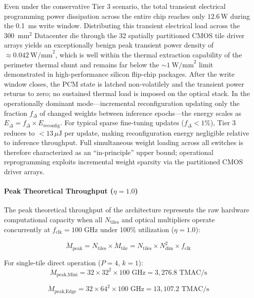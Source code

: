 \documentclass[journal]{IEEEtran}
\begin{document}
Even under the conservative Tier 3 scenario, the total transient electrical programming power dissipation across the entire chip reaches only $12.6\,\text{W}$ during the 0.1~ms write window. Distributing this transient electrical load across the 300~$\text{mm}^{2}$ Datacenter die through the 32 spatially partitioned CMOS tile driver arrays yields an exceptionally benign peak transient power density of $\approx 0.042~\text{W/mm}^{2}$, which is well within the thermal extraction capability of the perimeter thermal shunt and remains far below the $\sim 1~\text{W/mm}^{2}$ limit demonstrated in high-performance silicon flip-chip packages. After the write window closes, the PCM state is latched non-volatilely and the transient power returns to zero; no sustained thermal load is imposed on the optical stack. In the operationally dominant mode---incremental reconfiguration updating only the fraction $f_{\Delta}$ of changed weights between inference epochs---the energy scales as $E_{\Delta} = f_{\Delta} \times E_{\text{reconfig}}$. For typical sparse fine-tuning updates ($f_{\Delta} < 1\%$), Tier 3 reduces to $< 13\,\mu\text{J}$ per update, making reconfiguration energy negligible relative to inference throughput. Full simultaneous weight loading across all switches is therefore characterized as an ``in-principle'' upper bound; operational reprogramming exploits incremental weight sparsity via the partitioned CMOS driver arrays. 

\paragraph{\textbf{Peak Theoretical Throughput ($\eta = 1.0$)}}
The peak theoretical throughput of the architecture represents the raw hardware computational capacity when all $N_{\text{tiles}}$ and optical multipliers operate concurrently at $f_{\text{clk}} = 100\text{ GHz}$ under 100\% utilization ($\eta = 1.0$):

\begin{equation}
\dot{M}_{\text{peak}} = N_{\text{tiles}} \times \dot{M}_{\text{tile}} = N_{\text{tiles}} \times N_{\text{dim}}^2 \times f_{\text{clk}}
\end{equation}

For single-tile direct operation ($P=4$, $k=1$):
\begin{equation}
\dot{M}_{\text{peak,Mini}} = 32 \times 32^2 \times 100\text{ GHz} = 3,276.8\text{ TMAC/s}
\end{equation}

\begin{equation}
\dot{M}_{\text{peak,Edge}} = 32 \times 64^2 \times 100\text{ GHz} = 13,107.2\text{ TMAC/s}
\end{equation}
\end{document}
